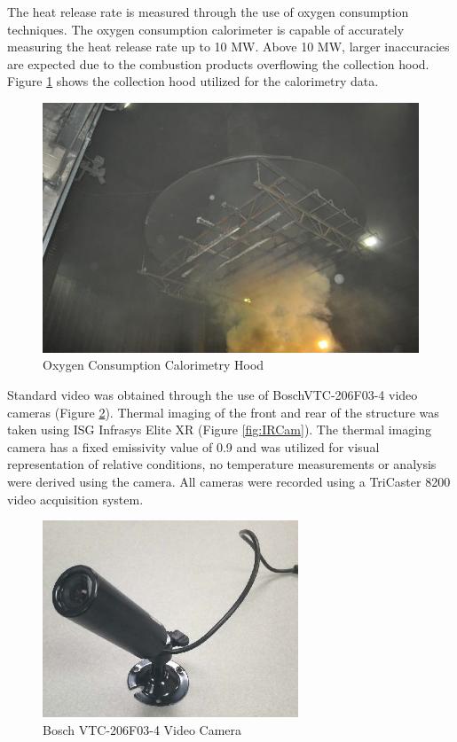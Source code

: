 \documentclass{article}
\begin{document}
The heat release rate is measured through the use of oxygen consumption techniques. The oxygen consumption calorimeter is capable of accurately measuring the heat release rate up to 10 MW. Above 10 MW, larger inaccuracies are expected due to the combustion products overflowing the collection hood. Figure \ref{fig:Hood} shows the collection hood utilized for the calorimetry data.

\begin{figure} [H]
	\centering
	\includegraphics[width = 5in]{0_Images/Instrumentation/Calorimetry_hood.jpg}
	\caption{Oxygen Consumption Calorimetry Hood}
	\label{fig:Hood}
\end{figure}

Standard video was obtained through the use of BoschVTC-206F03-4 video cameras (Figure \ref{fig:BullettCam}). Thermal imaging of the front and rear of the structure was taken using ISG Infrasys Elite XR (Figure \ref{fig:IRCam}). The thermal imaging camera has a fixed emissivity value of 0.9 and was utilized for visual representation of relative conditions, no temperature measurements or analysis were derived using the camera. All cameras were recorded using a TriCaster 8200 video acquisition system.

\begin{figure} [H]
	\centering
	\includegraphics[width = 3in]{0_Images/Instrumentation/BullettCam.jpg}
	\caption{Bosch VTC-206F03-4 Video Camera}
	\label{fig:BullettCam}
\end{figure}
\end{document}
